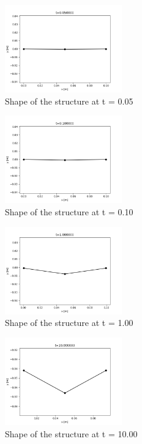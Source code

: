 \documentclass[letterpaper, 10 pt, conference]{ieeeconf}  %
\begin{document}
\begin{figure}[!ht]
        \centering
        \includegraphics[width=0.45\textwidth,keepaspectratio]{p1q1_implicit_0.05.png}
        \caption{Shape of the structure at t = 0.05}
        \label{"fig:p1q1_0.05"}
\end{figure}


\begin{figure}[!ht]
        \centering
        \includegraphics[width=0.45\textwidth,keepaspectratio]{p1q1_implicit_0.10.png}
        \caption{Shape of the structure at t = 0.10}
        \label{"fig:p1q1_0.10"}
\end{figure}


\begin{figure}[!ht]
        \centering
        \includegraphics[width=0.45\textwidth,keepaspectratio]{p1q1_implicit_1.00.png}
        \caption{Shape of the structure at t = 1.00}
        \label{"fig:p1q1_1.00"}
\end{figure}


\begin{figure}[!ht]
        \centering
        \includegraphics[width=0.45\textwidth,keepaspectratio]{p1q1_implicit_10.00.png}
        \caption{Shape of the structure at t = 10.00}
        \label{"fig:p1q1_10.00"}
\end{figure}
\end{document}
